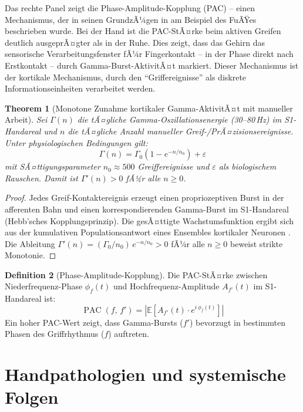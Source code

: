 ﻿\documentclass[12pt,a4paper]{report}
\theoremstyle{plain}
\newtheorem{theorem}{Theorem}[section]
\theoremstyle{definition}
\newtheorem{definition}[theorem]{Definition}
\theoremstyle{remark}
\DeclareMathOperator{\PAC}{PAC}
\begin{document}
Das rechte Panel zeigt die Phase-Amplitude-Kopplung (PAC) -- einen
Mechanismus, der in seinen GrundzÃ¼gen in \cite{epp2026feed} am Beispiel
des FuÃŸes beschrieben wurde. Bei der Hand ist die PAC-StÃ¤rke beim aktiven
Greifen deutlich ausgeprÃ¤gter als in der Ruhe. Dies zeigt, dass das
Gehirn das sensorische Verarbeitungsfenster fÃ¼r Fingerkontakt --
in der Phase direkt nach Erstkontakt -- durch Gamma-Burst-AktivitÃ¤t
markiert. Dieser Mechanismus ist der kortikale Mechanismus, durch den
``Griffereignisse'' als diskrete Informationseinheiten verarbeitet werden.

\begin{theorem}[Monotone Zunahme kortikaler Gamma-AktivitÃ¤t mit manueller Arbeit]
\label{thm:gamma}
Sei $\Gamma(n)$ die tÃ¤gliche Gamma-Oszillationsenergie (30--80\,Hz) im
S1-Handareal und $n$ die tÃ¤gliche Anzahl manueller Greif-/PrÃ¤zisionsereignisse.
Unter physiologischen Bedingungen gilt:
\[
  \Gamma(n) = \Gamma_0 \left(1 - e^{-n/n_0}\right) + \varepsilon
\]
mit SÃ¤ttigungsparameter $n_0 \approx 500$ Greiffereignisse und $\varepsilon$
als biologischem Rauschen. Damit ist $\Gamma'(n) > 0$ fÃ¼r alle $n \geq 0$.
\end{theorem}

\begin{proof}
Jedes Greif-Kontaktereignis erzeugt einen propriozeptiven Burst in der
afferenten Bahn und einen korrespondierenden Gamma-Burst im S1-Handareal
(Hebb'sches Kopplungsprinzip). Die gesÃ¤ttigte Wachstumsfunktion ergibt
sich aus der kumulativen Populationsantwort eines Ensembles kortikaler
Neuronen \cite{wilson1972}. Die Ableitung $\Gamma'(n) = (\Gamma_0/n_0)\,e^{-n/n_0} > 0$
fÃ¼r alle $n \geq 0$ beweist strikte Monotonie.
\end{proof}

\begin{definition}[Phase-Amplitude-Kopplung]
Die PAC-StÃ¤rke zwischen Niederfrequenz-Phase $\phi_f(t)$ und
Hochfrequenz-Amplitude $A_{f'}(t)$ im S1-Hand\-areal ist:
\[
  \PAC(f,\, f') = \left|\mathbb{E}\!\left[A_{f'}(t)\cdot e^{i\,\phi_f(t)}\right]\right|
\]
Ein hoher PAC-Wert zeigt, dass Gamma-Bursts ($f'$) bevorzugt in
bestimmten Phasen des Griffrhythmus ($f$) auftreten.
\end{definition}

\chapter{Handpathologien und systemische Folgen}
\label{chap:pathologien}
\end{document}
